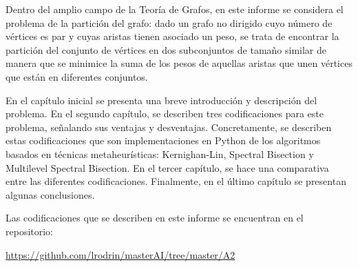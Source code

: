 Dentro del amplio campo de la Teoría de Grafos, en este informe se considera el problema de la partición del grafo: dado un grafo no dirigido cuyo número de vértices es par y cuyas aristas tienen asociado un peso, se trata de encontrar la partición del conjunto de vértices en dos subconjuntos de tamaño similar de manera que se minimice la suma de los pesos de aquellas aristas que unen vértices que están en diferentes conjuntos.

En el capítulo inicial se presenta una breve introducción y descripción del problema. En el segundo capítulo, se describen tres codificaciones para este problema, señalando sus ventajas y desventajas. Concretamente, se describen estas codificaciones que son implementaciones en Python de los algoritmos basados en técnicas metaheurísticas: Kernighan-Lin, Spectral Bisection y Multilevel Spectral Bisection. En el tercer capítulo, se hace una comparativa entre las diferentes codificaciones. Finalmente, en el último capítulo se presentan algunas conclusiones.

Las codificaciones que se describen en este informe se encuentran en el repositorio:

\begin{center}
	\url{https://github.com/lrodrin/masterAI/tree/master/A2}\label{GitHub}
\end{center}

